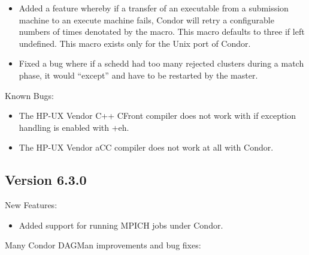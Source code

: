 \begin{itemize}
\item Added a feature whereby if a transfer of an executable
from a submission machine to an execute machine fails, Condor
will retry a configurable numbers of times denotated by the
 macro. This macro defaults to three if
left undefined. This macro exists only for the Unix port of Condor.

\item Fixed a bug where if a schedd had too many rejected clusters during a
match phase, it would ``except'' and have to be restarted by the master.

\end{itemize}

\noindent Known Bugs:
\begin{itemize}
\item The HP-UX Vendor C++ CFront compiler does not work with 
if exception handling is enabled with +eh.

\item The HP-UX Vendor aCC compiler does not work at all with Condor.
\end{itemize}

\subsection*{\label{sec:New-6-3-0}Version 6.3.0}

\noindent New Features:
\begin{itemize}

\item Added support for running MPICH jobs under Condor.

\end{itemize}

\noindent
Many Condor DAGMan improvements and bug fixes:

